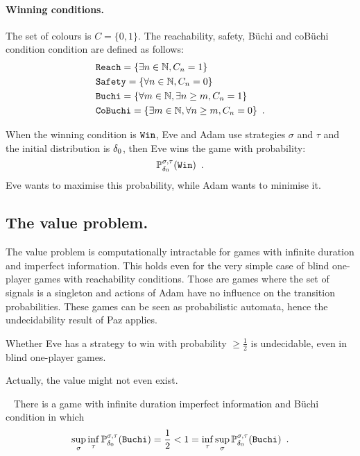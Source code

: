 \newcommand{\win}{{\tt Win}}
\newcommand{\winreach}{{\tt Reach}}
\newcommand{\winsafe}{{\tt Safety}}
\newcommand{\winbuchi}{{\tt Buchi}}
\newcommand{\wincobuchi}{{\tt CoBuchi}}
\paragraph{Winning conditions.}

The set of colours is $C=\{0,1\}$.
The reachability, safety, B\"uchi and coB\"uchi condition
 condition are defined as follows:
 \begin{align*}
 &\winreach=\{\exists n\in\NN, C_n  = 1\}\\
&\winsafe=\{\forall n\in\NN, C_n = 0\}\\
&\winbuchi=\{\forall m \in \NN, \exists n \geq m, C_n=1\}\\
&\wincobuchi = \{\exists m \in \NN, \forall n \geq m, C_n = 0\}\enspace.
\end{align*}

When the winning condition is $\win$,
Eve and Adam use strategies
$\sigma$ and $\tau$ and the initial distribution is $\delta_0$,
then Eve wins the game with probability:
\[
\mathbb{P}^{\sigma,\tau}_{\ini}(\win)\enspace.
\]
Eve wants to maximise this probability, while Adam wants
to minimise it.  



\subsection{The value problem.}

The value problem is computationally intractable
for games with infinite duration and imperfect information.
This holds even for the very simple case
of blind one-player games with reachability conditions.
Those are games where the set of
signals is a singleton and actions of Adam have no influence
on the transition probabilities. These games can be seen
as probabilistic automata, hence the undecidability result of Paz applies.

\begin{theorem}\cite{Paz}
Whether Eve has a strategy to win with probability $\geq \frac{1}{2}$
is undecidable, even in blind one-player games.
\end{theorem}

Actually, the value might not even exist.
\begin{proposition}~\cite{repgames}
There is a game with infinite duration imperfect information and B\"uchi condition
in which 
\[
\sup_\sigma \inf_\tau \mathbb{P}^{\sigma,\tau}_{\ini}(\winbuchi)
=
\frac{1}{2}
<
1
=
\inf_\tau \sup_\sigma  \mathbb{P}^{\sigma,\tau}_{\ini}(\winbuchi)\enspace.
\]
\end{proposition}

